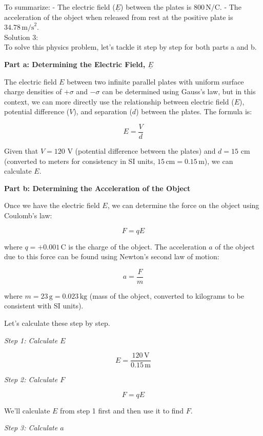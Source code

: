 \documentclass[a4paper,11pt]{article}
\begin{document}
To summarize:
- The electric field (\( \underline{E} \)) between the plates is \( 800 \, \text{N/C} \).
- The acceleration of the object when released from rest at the positive plate is \( 34.78 \, \text{m/s}^2 \). \\

\noindent Solution 3: \\ 

To solve this physics problem, let's tackle it step by step for both parts a and b.

\textbf{Part a: Determining the Electric Field, \( \underline{E} \)}

The electric field \( E \) between two infinite parallel plates with uniform surface charge densities of \( +\sigma \) and \( -\sigma \) can be determined using Gauss's law, but in this context, we can more directly use the relationship between electric field (\( E \)), potential difference (\( V \)), and separation (\( d \)) between the plates. The formula is:

\[
E = \frac{V}{d}
\]

Given that \( V = 120 \) V (potential difference between the plates) and \( d = 15 \) cm (converted to meters for consistency in SI units, \( 15 \, \text{cm} = 0.15 \, \text{m} \)), we can calculate \( E \).

\textbf{Part b: Determining the Acceleration of the Object}

Once we have the electric field \( E \), we can determine the force on the object using Coulomb's law:

\[
F = qE
\]

where \( q = +0.001 \, \text{C} \) is the charge of the object. The acceleration \( a \) of the object due to this force can be found using Newton's second law of motion:

\[
a = \frac{F}{m}
\]

where \( m = 23 \, \text{g} = 0.023 \, \text{kg} \) (mass of the object, converted to kilograms to be consistent with SI units).

Let's calculate these step by step.

\textit{Step 1: Calculate \( E \)}

\[
E = \frac{120 \, \text{V}}{0.15 \, \text{m}}
\]

\textit{Step 2: Calculate \( F \)}

\[
F = qE
\]

We'll calculate \( E \) from step 1 first and then use it to find \( F \).

\textit{Step 3: Calculate \( a \)}
\end{document}
